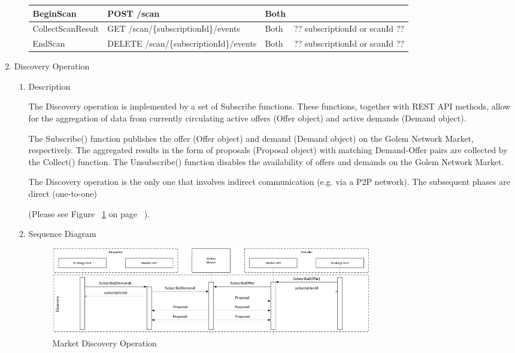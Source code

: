 \begin{enumerate}
\begin{enumerate}
\begin{center}
\begin{tabular}{|p{3cm}|p{7cm}|p{1.5cm}|p{4cm}|}
BeginScan 				& POST /scan								&	Both	&	\\
\hline

CollectScanResult		& GET /scan/\{subscriptionId\}/events		&	Both 	& ?? subscriptionId or scanId ??	\\
\hline

EndScan 				& DELETE /scan/\{subscriptionId\}/events	&	Both 	& ?? subscriptionId or scanId ??	\\
\hline

\end{tabular}
\end{center}

\end{enumerate}

\break

\item  Discovery Operation

\begin{enumerate}

\item Description

The Discovery operation is implemented by a set of Subscribe functions. These functions, together with REST API methods, 
allow for the aggregation of data from currently circulating active offers (Offer object) and active demands (Demand object).

The Subscribe() function publishes the offer (Offer object) and demand (Demand object) on the Golem Network Market, respectively.
The aggregated results in the form of proposals (Proposal object) with matching Demand-Offer pairs are collected by the Collect() function.
The Unsubscribe() function disables the availability of offers and demands on the Golem Network Market.

The Discovery operation is the only one that involves indirect communication (e.g. via a P2P network).
The subsequent phases are direct (one-to-one)

(Please see Figure ~\ref{fig:MDO} on page ~\pageref{fig:MDO}).

\item Sequence Diagram

\begin{figure}[htbp]
    \centering
    \includegraphics[width=14cm,angle=0]{./diag/Sequence/MarketDiscovery-B-Sequence.png}
	\caption{Market Discovery Operation}
    \label{fig:MDO}
\end{figure}


\end{enumerate}
\end{enumerate}
